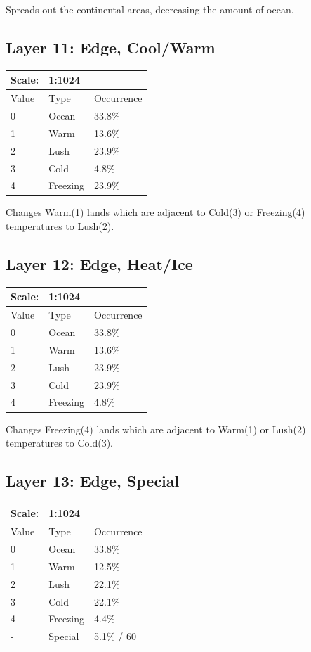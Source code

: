\documentclass{article}
\begin{document}
	\medskip\noindent
	Spreads out the continental areas, decreasing the amount of ocean.

	\subsection{Layer 11: Edge, Cool/Warm}
	\begin{tabular}{|l|l|l|}\hline
		Scale: & \multicolumn{2}{|l|}{1:1024} \\\hline\hline
		Value  & Type     & Occurrence \\\hline
		0      & Ocean    & 33.8\%\\\hline
		1      & Warm     & 13.6\%\\\hline
		2      & Lush     & 23.9\%\\\hline
		3      & Cold     & 4.8\%\\\hline
		4      & Freezing & 23.9\%\\\hline
	\end{tabular}

	\medskip\noindent
	Changes Warm(1) lands which are adjacent to Cold(3) or Freezing(4) temperatures to Lush(2).

	\subsection{Layer 12: Edge, Heat/Ice}
	\begin{tabular}{|l|l|l|}\hline
		Scale: & \multicolumn{2}{|l|}{1:1024} \\\hline\hline
		Value  & Type     & Occurrence \\\hline
		0      & Ocean    & 33.8\%\\\hline
		1      & Warm     & 13.6\%\\\hline
		2      & Lush     & 23.9\%\\\hline
		3      & Cold     & 23.9\%\\\hline
		4      & Freezing & 4.8\%\\\hline
	\end{tabular}

	\medskip\noindent
	Changes Freezing(4) lands which are adjacent to Warm(1) or Lush(2) temperatures to Cold(3).

	\subsection{Layer 13: Edge, Special}
	\begin{tabular}{|l|l|l|}\hline
		Scale: & \multicolumn{2}{|l|}{1:1024} \\\hline\hline
		Value  & Type     & Occurrence \\\hline
		0      & Ocean    & 33.8\%\\\hline
		1      & Warm     & 12.5\%\\\hline
		2      & Lush     & 22.1\%\\\hline
		3      & Cold     & 22.1\%\\\hline
		4      & Freezing & 4.4\%\\\hline
		-      & Special  & 5.1\% / 60\\\hline
	\end{tabular}
\end{document}
